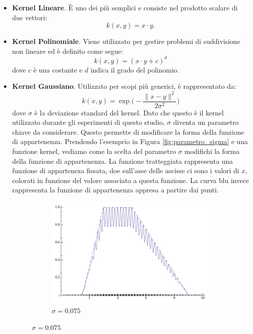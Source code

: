 \documentclass[a4paper,12pt]{report}
\begin{document}
\begin{itemize}
    \item \textbf{Kernel Lineare}. \`E uno dei più semplici e consiste nel prodotto scalare di due vettori:
    \begin{equation*}
        k(x,y) = x \cdot y.
    \end{equation*}

    \item  \textbf{Kernel Polinomiale}. Viene utilizzato per gestire problemi di suddivisione non lineare ed è definito come segue:
    \begin{equation*}
        k(x,y) = (x \cdot y + c)^{d}
    \end{equation*}
    \noindent dove $c$ è  una costante e $d$ indica il grado del polinomio.

    \item \textbf{Kernel Gaussiano}. Utilizzato per scopi più generici, è rappresentato da:
    \begin{equation*}
        k(x,y) = \exp{\bigg(-\frac{\|x-y\|^{2}}{2\sigma^{2}}\bigg)}
    \end{equation*}
    \noindent dove $\sigma$ è la deviazione standard del kernel. Dato che questo è il kernel utilizzato durante gli esperimenti di questo studio, $\sigma$ diventa un parametro chiave da considerare. Questo permette di modificare la forma della funzione di appartenenza. Prendendo l'esemprio in Figura \ref{fig:parametro_sigma} e una funzione kernel, vediamo come la scelta del parametro $\sigma$ modifichi la forma della funzione di appartenenza. La funzione tratteggiata rappresenta una funzione di apparteneza fissata, doe sull'asse delle ascisse ci sono i valori di $x$, colorati in funzione del valore associato a questa funzione. La curva blu invece rappresenta la funzione di appartenenza appresa a partire dai punti.

    \begin{figure}[h]
        \begin{subfigure}[t]{0.32\textwidth}
           \centering
           \includegraphics[scale=0.18]{images/parametro_sigma_1.png}
           \caption{$\sigma = 0.075 $}
           \label{fig:sigma_1}
    

\end{subfigure}
\end{figure}
\end{itemize}
\end{document}
